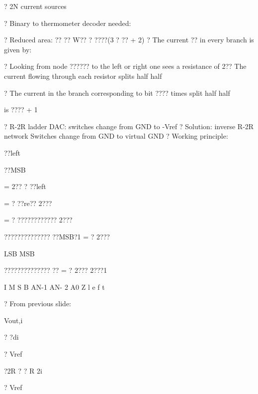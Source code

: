 \documentclass[2pt,landscape]{article}
\begin{document}
\begin{multicols*}{5}
?	2N current sources



?	Binary to thermometer decoder needed:






?	Reduced area: ?? ?? W?? ? ????(3 ? ?? + 2)
?	The current ?? in every branch is given by:


?	Looking from node ?????? to the left or right one sees a resistance of 2??
The current flowing through each resistor splits half half








?	The current in the branch corresponding to bit ????
times split half half


is ???? + 1










?	R-2R ladder DAC: switches change from GND to -Vref
?	Solution: inverse R-2R network
\textbullet 	Switches change from GND to virtual GND
?	Working principle:



\textbullet 	??left

\textbullet 	??MSB


= 2?? ? ??left

= ? ??re??
2???


= ? ????????????
2???





??????????????
\textbullet 	??MSB?1 = ? 2???



LSB	MSB





??????????????
\textbullet 	??	= ? 2??? 
2???1



I
M
S
B
AN-1	AN-
2	A0
Z
l
e
f
t



?	From previous slide:



Vout,i



? ?di


? Vref


?2R ? ? R
2i



? Vref




\end{multicols*}
\end{document}
